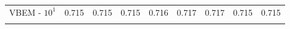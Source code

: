 \begin{table}[t]
\begin{tabular*}{\textwidth}{@{\extracolsep{\fill}}lrrrrrrrr@{\extracolsep{\fill}}}
VBEM - $10^{1}$  & 0.715 & 0.715 & 0.715 & 0.716 & 0.717 & 0.717 & 0.715 & 0.715 \\
  \botrule
  \end{tabular*}
  \end{table}

  

